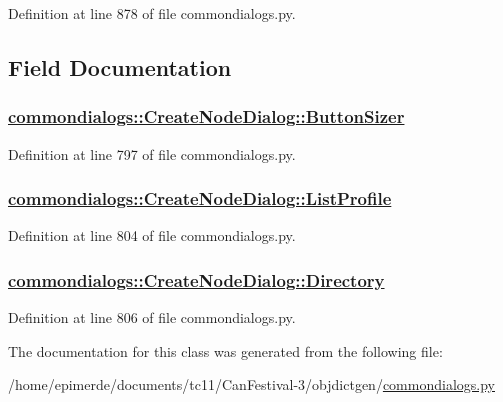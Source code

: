 Definition at line 878 of file commondialogs.py.

\subsection{Field Documentation}
\hypertarget{classcommondialogs_1_1CreateNodeDialog_7a8dc1f8cd4b452dbba2203499aad52c}{
\subsubsection[ButtonSizer]{\setlength{\rightskip}{0pt plus 5cm}\hyperlink{classcommondialogs_1_1CreateNodeDialog_7a8dc1f8cd4b452dbba2203499aad52c}{commondialogs::Create\-Node\-Dialog::Button\-Sizer}}}
\label{classcommondialogs_1_1CreateNodeDialog_7a8dc1f8cd4b452dbba2203499aad52c}




Definition at line 797 of file commondialogs.py.\hypertarget{classcommondialogs_1_1CreateNodeDialog_a5b092c98d3fd4ea4cdffa4d48150ac4}{
\subsubsection[ListProfile]{\setlength{\rightskip}{0pt plus 5cm}\hyperlink{classcommondialogs_1_1CreateNodeDialog_a5b092c98d3fd4ea4cdffa4d48150ac4}{commondialogs::Create\-Node\-Dialog::List\-Profile}}}
\label{classcommondialogs_1_1CreateNodeDialog_a5b092c98d3fd4ea4cdffa4d48150ac4}




Definition at line 804 of file commondialogs.py.\hypertarget{classcommondialogs_1_1CreateNodeDialog_37780e6f4737ffa27ff08bc4de64711c}{
\subsubsection[Directory]{\setlength{\rightskip}{0pt plus 5cm}\hyperlink{classcommondialogs_1_1CreateNodeDialog_37780e6f4737ffa27ff08bc4de64711c}{commondialogs::Create\-Node\-Dialog::Directory}}}
\label{classcommondialogs_1_1CreateNodeDialog_37780e6f4737ffa27ff08bc4de64711c}




Definition at line 806 of file commondialogs.py.

The documentation for this class was generated from the following file:\begin{CompactItemize}
\item 
/home/epimerde/documents/tc11/Can\-Festival-3/objdictgen/\hyperlink{commondialogs_8py}{commondialogs.py}\end{CompactItemize}
